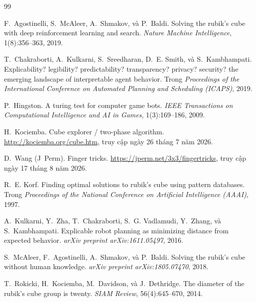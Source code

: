\documentclass[10pt,conference]{article}
\begin{document}

\begin{thebibliography}{99}

F.~Agostinelli, S.~McAleer, A.~Shmakov, và P.~Baldi.
\newblock Solving the rubik's cube with deep reinforcement learning and
  search.
\newblock \emph{Nature Machine Intelligence}, 1(8):356--363, 2019.

T.~Chakraborti, A.~Kulkarni, S.~Sreedharan, D.~E. Smith, và
S.~Kambhampati.
\newblock Explicability? legibility? predictability? transparency?
  privacy? security? the emerging landscape of interpretable agent
  behavior.
\newblock Trong \emph{Proceedings of the International Conference on
  Automated Planning and Scheduling (ICAPS)}, 2019.

P.~Hingston.
\newblock A turing test for computer game bots.
\newblock \emph{IEEE Transactions on Computational Intelligence and AI
  in Games}, 1(3):169--186, 2009.

H.~Kociemba.
\newblock Cube explorer / two-phase algorithm.
\newblock \url{http://kociemba.org/cube.htm}, truy cập ngày 26 tháng 7 năm 2026.

D.~Wang (J~Perm).
\newblock Finger tricks.
\newblock \url{https://jperm.net/3x3/fingertricks}, truy cập ngày 17 tháng 8 năm 2026.

R.~E. Korf.
\newblock Finding optimal solutions to rubik's cube using pattern
  databases.
\newblock Trong \emph{Proceedings of the National Conference on
  Artificial Intelligence (AAAI)}, 1997.

A.~Kulkarni, Y.~Zha, T.~Chakraborti, S.~G. Vadlamudi, Y.~Zhang, và
S.~Kambhampati.
\newblock Explicable robot planning as minimizing distance from
  expected behavior.
\newblock \emph{arXiv preprint arXiv:1611.05497}, 2016.

S.~McAleer, F.~Agostinelli, A.~Shmakov, và P.~Baldi.
\newblock Solving the rubik's cube without human knowledge.
\newblock \emph{arXiv preprint arXiv:1805.07470}, 2018.

T.~Rokicki, H.~Kociemba, M.~Davidson, và J.~Dethridge.
\newblock The diameter of the rubik's cube group is twenty.
\newblock \emph{SIAM Review}, 56(4):645--670, 2014.


\end{thebibliography}
\end{document}
